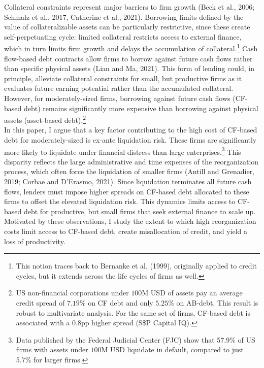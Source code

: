 \documentclass[12pt]{article}
\begin{document}
Collateral constraints represent major barriers to firm growth (Beck et al., 2006; Schmalz et al., 2017, Catherine et al., 2021). Borrowing limits defined by the value of collateralizable assets can be particularly restrictive, since these create self-perpetuating cycle: limited collateral restricts access to external finance, which in turn limits firm growth and delays the accumulation of collateral.\footnote{This notion traces back to Bernanke et al. (1999), originally applied to credit cycles, but it extends across the life cycles of firms as well.} Cash flow-based debt contracts allow firms to borrow against future cash flows rather than specific physical assets (Lian and Ma, 2021). This form of lending could, in principle, alleviate collateral constraints for small, but productive firms as it evaluates future earning potential rather than the accumulated collateral. However, for moderately-sized firms, borrowing against future cash flows (CF-based debt) remains significantly more expensive than borrowing against physical assets (asset-based debt).\footnote{US non-financial corporations under $100$M USD of assets pay an average credit spread of $7.19\%$ on CF debt and only $5.25\%$ on AB-debt. This result is robust to multivariate analysis. For the same set of firms, CF-based debt is associated with a 0.8pp higher spread (S\$P Capital IQ).}  \vspace{3mm}  \\
In this paper, I argue that a key factor contributing to the high cost of CF-based debt for moderately-sized is ex-ante liquidation risk. These firms are significantly more likely to liquidate under financial distress than large enterprises.\footnote{Data published by the Federal Judicial Center (FJC) show that 57.9\% of US firms with assets under $100$M USD liquidate in default, compared to just 5.7\% for larger firms.} This disparity reflects the large administrative and time expenses of the reorganization process, which often force the liquidation of smaller firms (Antill and Grenadier, 2019; Corbae and D'Erasmo, 2021). Since liquidation terminates all future cash flows, lenders must impose higher spreads on CF-based debt allocated to these firms to offset the elevated liquidation risk. This dynamics limits access to CF-based debt for productive, but small firms that seek external finance to scale up. Motivated by these observations, I study the extent to which high reorganization costs limit access to CF-based debt, create misallocation of credit, and yield a loss of productivity. \vspace{3mm}  \\
\end{document}

